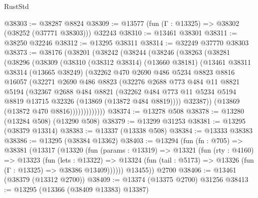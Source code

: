 \begin{lexlean}{RustStd}
\begin{coremodule}
@38303 := @38287 @8824
@38309 := @13577 (fun (Γ : @13325) => @38302 (@38252 (@37771 @38303))) @32243
@38310 := @13461 @38301
@38311 := @38250 @32246
@38312 := @13295 @38311
@38314 := @32249 @37770 @38303
@38373 := @38176
    (@38201
      (@38242
        (@38244
          (@38246
            (@38263
              (@38281
                (@38296
                  (@38309
                    (@38310
                      (@38312 @38314)
                      (@13660 @38181)
                      (@13461
                        @38311
                        @38314
                        (@13665 @38249)
                        (@32262
                          @470
                          @2690
                          @486
                          @5234
                          @8823
                          @8816
                          @16057
                          (@32271
                            @2690
                            @486
                            @8823
                            (@32276
                              @2688
                              @773
                              @484
                              @11
                              @8821
                              @5194
                              (@32367
                                @2688
                                @484
                                @8821
                                (@32262
                                  @484
                                  @773
                                  @11
                                  @5234
                                  @5194
                                  @8819
                                  @13715
                                  @32326
                                  (@13869 (@13872 @484 @8819))))
                              @32387))
                          (@13869 (@13872 @470 @8816)))))))))))))
@38374 := @13278 @508
@38378 := @13280 (@13284 @508) (@13290 @508)
@38379 := @13299 @31253
@38381 := @13295 (@38379 @13314)
@38383 := @13337 (@13338 @508)
@38384 := @13333 @38383
@38386 := @13295 (@38384 @13362)
@38403 := @13294
    (fun (fn : @705) =>
    @38381
      (@13317
        (@13320
          (fun (params : @13319) =>
          @13321
            (fun (rty : @4160) =>
            @13323
              (fun (lets : @13322) =>
              @13324 (fun (tail : @5173) => @13326 (fun (Γ : @13325) => @38386 @13409))))))
        @13455))
    @2700
@38406 := @13461 (@38379 (@13312 @2700))
@38409 := @13374 (@13375 @2700) @31256
@38413 := @13295 (@13366 (@38409 @13383) @13387)

\end{coremodule}
\end{lexlean}
